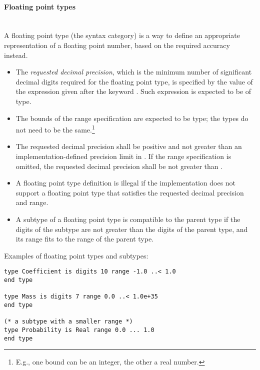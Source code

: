 \paragraph{Floating point types} ~\\
A floating point type (the  syntax category) is a way to define an appropriate representation of a floating point number, based on the required accuracy instead. 
\begin{itemize}
  \item[] The {\em requested decimal precision}, which is the minimum number of significant decimal digits required for the floating point type, is specified by the value of the expression given after the keyword . Such expression is expected to be of  type. 
  \item[] The bounds of the range specification are expected to be  type; the types do not need to be the same.\footnote{E.g., one bound can be an integer, the other a real number.}
  \item[] The requested decimal precision shall be positive and not greater than an implementation-defined precision limit in . If the range specification is omitted, the requested decimal precision shall be not greater than . 
  \item[] A floating point type definition is illegal if the implementation does not support a floating point type that satisfies the requested decimal precision and range. 
  \item[] A subtype of a floating point type is compatible to the parent type if the digits of the subtype are not greater than the digits of the parent type, and its range fits to the range of the parent type. 
\end{itemize}

\example Examples of floating point types and subtypes:
\begin{lstlisting}
type Coefficient is digits 10 range -1.0 ..< 1.0 
end type

type Mass is digits 7 range 0.0 ..< 1.0e+35 
end type

(* a subtype with a smaller range *)
type Probability is Real range 0.0 ... 1.0
end type
\end{lstlisting}

